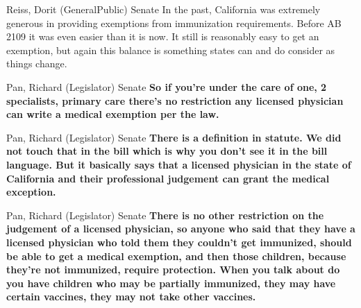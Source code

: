 \begin{result}{15.542348794795622}{Reiss, Dorit (GeneralPublic) Senate}
In the past, California was extremely generous in providing exemptions from immunization requirements. Before AB 2109 it was even easier than it is now. It still is reasonably easy to get an exemption, but again this balance is something states can and do consider as things change.
\end{result}

\begin{result}{14.421991099835951}{Pan, Richard (Legislator) Senate}
\textbf{So if you're under the care of one, 2 specialists, primary care there's no restriction any licensed physician can write a medical exemption per the law.
}\end{result}

\begin{result}{13.499722256772912}{Pan, Richard (Legislator) Senate}
\textbf{There is a definition in statute. We did not touch that in the bill which is why you don't see it in the bill language. But it basically says that a licensed physician in the state of California and their professional judgement can grant the medical exception.
}\end{result}

\begin{result}{13.032809048933341}{Pan, Richard (Legislator) Senate}
\textbf{There is no other restriction on the judgement of a licensed physician, so anyone who said that they have a licensed physician who told them they couldn't get immunized, should be able to get a medical exemption, and then those children, because they're not immunized, require protection. When you talk about do you have children who may be partially immunized, they may have certain vaccines, they may not take other vaccines.
}\end{result}

